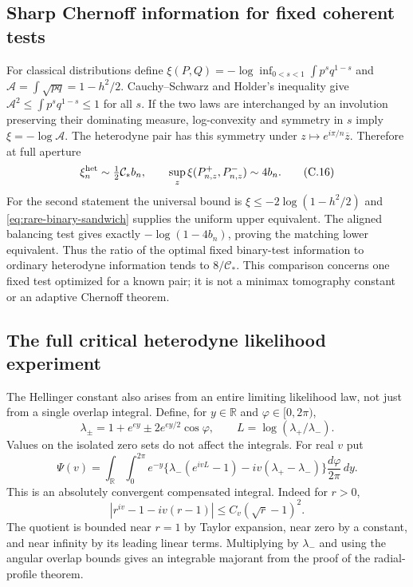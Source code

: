 \documentclass[11pt,a4paper]{article}
\numberwithin{equation}{section}
\begin{document}
\subsection{Sharp Chernoff information for fixed coherent tests}
For classical distributions define
$\xi(P,Q)=-\log\inf_{0<s<1}\int p^s q^{1-s}$ and
$\mathcal A=\int\sqrt{pq}=1-h^2/2$.
Cauchy--Schwarz and Holder's inequality give
$\mathcal A^2\le\int p^s q^{1-s}\le1$ for all $s$.
If the two laws are interchanged by an involution preserving their dominating
measure, log-convexity and symmetry in $s$ imply
$\xi=-\log\mathcal A$.
The heterodyne pair has this symmetry under $z\mapsto e^{i\pi/n}\overline z$.
Therefore at full aperture
\[
 \xi_{n}^{\rm het}\sim\tfrac12\mathcal C_*b_n,
 \qquad
 \sup_z\xi(P_{n,z}^+,P_{n,z}^-)\sim4b_n.
 \tag{C.16}\label{eq:rare-chernoff}
\]
For the second statement the universal bound is
$\xi\le-2\log(1-h^2/2)$ and
\eqref{eq:rare-binary-sandwich} supplies the uniform upper equivalent.
The aligned balancing test gives exactly $-\log(1-4b_n)$, proving the
matching lower equivalent. Thus the ratio of the optimal fixed binary-test
information to ordinary heterodyne information tends to $8/\mathcal C_*$.
This comparison concerns one fixed test optimized for a known pair; it is
not a minimax tomography constant or an adaptive Chernoff theorem.

\subsection{The full critical heterodyne likelihood experiment}
The Hellinger constant also arises from an entire limiting likelihood law,
not just from a single overlap integral. Define, for $y\in\mathbb R$ and
$\varphi\in[0,2\pi)$,
\[
 \lambda_\pm=1+e^{ey}\pm2e^{ey/2}\cos\varphi,
 \qquad L=\log(\lambda_+/\lambda_-).
\]
Values on the isolated zero sets do not affect the integrals. For real $v$ put
\[
 \Psi(v)=\int_{\mathbb R}\int_0^{2\pi}e^{-y}
 \{\lambda_-(e^{ivL}-1)-iv(\lambda_+-\lambda_-)\}
                    \frac{d\varphi}{2\pi}\,dy.
 \tag{C.17}\label{eq:rare-likelihood-exponent}
\]
This is an absolutely convergent compensated integral. Indeed for $r>0$,
\[
 |r^{iv}-1-iv(r-1)|\le C_v(\sqrt r-1)^2.
\]
The quotient is bounded near $r=1$ by Taylor expansion, near zero by a
constant, and near infinity by its leading linear terms. Multiplying by
$\lambda_-$ and using the angular overlap bounds gives an integrable
majorant from the proof of the radial-profile theorem.
\end{document}
